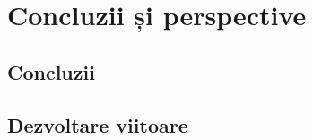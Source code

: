 \chapter{Concluzii și perspective}
\label{chapter:concluzii}

\section{Concluzii}
\label{sec:concluzii}

\section{Dezvoltare viitoare}
\label{sec:dezvoltare-viitoare}